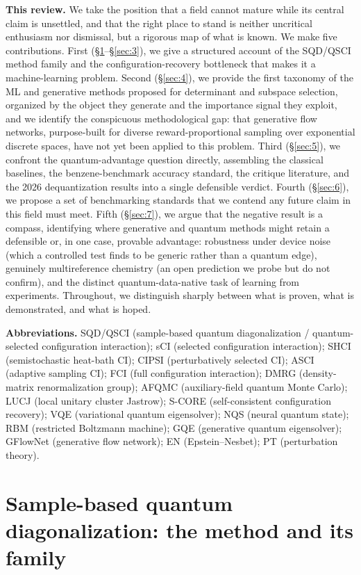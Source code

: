 \documentclass[11pt]{article}
\begin{document}
\textbf{This review.} We take the position that a field cannot mature while its central claim is unsettled, and that the right place to stand is neither uncritical enthusiasm nor dismissal, but a rigorous map of what is known. We make five contributions. First (\S\ref{sec:2}--\S\ref{sec:3}), we give a structured account of the SQD/QSCI method family and the configuration-recovery bottleneck that makes it a machine-learning problem. Second (\S\ref{sec:4}), we provide the first taxonomy of the ML and generative methods proposed for determinant and subspace selection, organized by the object they generate and the importance signal they exploit, and we identify the conspicuous methodological gap: that generative flow networks, purpose-built for diverse reward-proportional sampling over exponential discrete spaces, have not yet been applied to this problem. Third (\S\ref{sec:5}), we confront the quantum-advantage question directly, assembling the classical baselines, the benzene-benchmark accuracy standard, the critique literature, and the 2026 dequantization results into a single defensible verdict. Fourth (\S\ref{sec:6}), we propose a set of benchmarking standards that we contend any future claim in this field must meet. Fifth (\S\ref{sec:7}), we argue that the negative result is a compass, identifying where generative and quantum methods might retain a defensible or, in one case, provable advantage: robustness under device noise (which a controlled test finds to be generic rather than a quantum edge), genuinely multireference chemistry (an open prediction we probe but do not confirm), and the distinct quantum-data-native task of learning from experiments. Throughout, we distinguish sharply between what is proven, what is demonstrated, and what is hoped.

\medskip\noindent\textbf{Abbreviations.} {\footnotesize SQD/QSCI (sample-based quantum diagonalization / quantum-selected configuration interaction); sCI (selected configuration interaction); SHCI (semistochastic heat-bath CI); CIPSI (perturbatively selected CI); ASCI (adaptive sampling CI); FCI (full configuration interaction); DMRG (density-matrix renormalization group); AFQMC (auxiliary-field quantum Monte Carlo); LUCJ (local unitary cluster Jastrow); S-CORE (self-consistent configuration recovery); VQE (variational quantum eigensolver); NQS (neural quantum state); RBM (restricted Boltzmann machine); GQE (generative quantum eigensolver); GFlowNet (generative flow network); EN (Epstein--Nesbet); PT (perturbation theory).}


\section{Sample-based quantum diagonalization: the method and its family}\label{sec:2}
\end{document}
